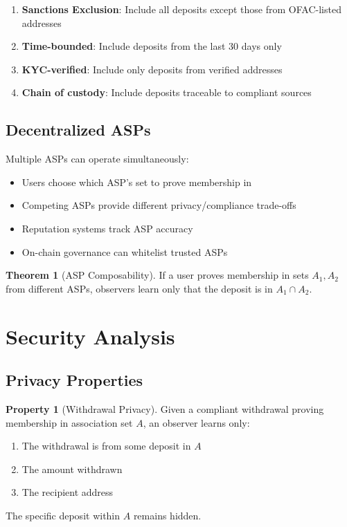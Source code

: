 \documentclass[11pt,a4paper]{article}
\theoremstyle{definition}
\newtheorem{theorem}{Theorem}
\newtheorem{property}{Property}
\begin{document}
\begin{enumerate}
    \item \textbf{Sanctions Exclusion}: Include all deposits except those from OFAC-listed addresses
    \item \textbf{Time-bounded}: Include deposits from the last 30 days only
    \item \textbf{KYC-verified}: Include only deposits from verified addresses
    \item \textbf{Chain of custody}: Include deposits traceable to compliant sources
\end{enumerate}

\subsection{Decentralized ASPs}

Multiple ASPs can operate simultaneously:

\begin{itemize}
    \item Users choose which ASP's set to prove membership in
    \item Competing ASPs provide different privacy/compliance trade-offs
    \item Reputation systems track ASP accuracy
    \item On-chain governance can whitelist trusted ASPs
\end{itemize}

\begin{theorem}[ASP Composability]
If a user proves membership in sets $A_1, A_2$ from different ASPs, observers learn only that the deposit is in $A_1 \cap A_2$.
\end{theorem}

\section{Security Analysis}

\subsection{Privacy Properties}

\begin{property}[Withdrawal Privacy]
Given a compliant withdrawal proving membership in association set $A$, an observer learns only:
\begin{enumerate}
    \item The withdrawal is from some deposit in $A$
    \item The amount withdrawn
    \item The recipient address
\end{enumerate}
The specific deposit within $A$ remains hidden.
\end{property}
\end{document}
